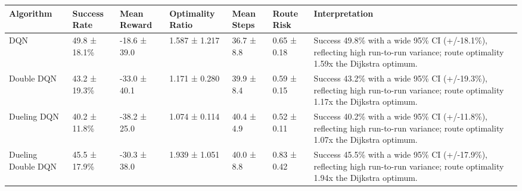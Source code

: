 \begin{tabular}{lllllll}
\toprule
Algorithm & Success Rate & Mean Reward & Optimality Ratio & Mean Steps & Route Risk & Interpretation \\
\midrule
DQN & 49.8 ± 18.1\% & -18.6 ± 39.0 & 1.587 ± 1.217 & 36.7 ± 8.8 & 0.65 ± 0.18 & Success 49.8\% with a wide 95\% CI (+/-18.1\%), reflecting high run-to-run variance; route optimality 1.59x the Dijkstra optimum. \\
Double DQN & 43.2 ± 19.3\% & -33.0 ± 40.1 & 1.171 ± 0.280 & 39.9 ± 8.4 & 0.59 ± 0.15 & Success 43.2\% with a wide 95\% CI (+/-19.3\%), reflecting high run-to-run variance; route optimality 1.17x the Dijkstra optimum. \\
Dueling DQN & 40.2 ± 11.8\% & -38.2 ± 25.0 & 1.074 ± 0.114 & 40.4 ± 4.9 & 0.52 ± 0.11 & Success 40.2\% with a wide 95\% CI (+/-11.8\%), reflecting high run-to-run variance; route optimality 1.07x the Dijkstra optimum. \\
Dueling Double DQN & 45.5 ± 17.9\% & -30.3 ± 38.0 & 1.939 ± 1.051 & 40.0 ± 8.8 & 0.83 ± 0.42 & Success 45.5\% with a wide 95\% CI (+/-17.9\%), reflecting high run-to-run variance; route optimality 1.94x the Dijkstra optimum. \\
\bottomrule
\end{tabular}
